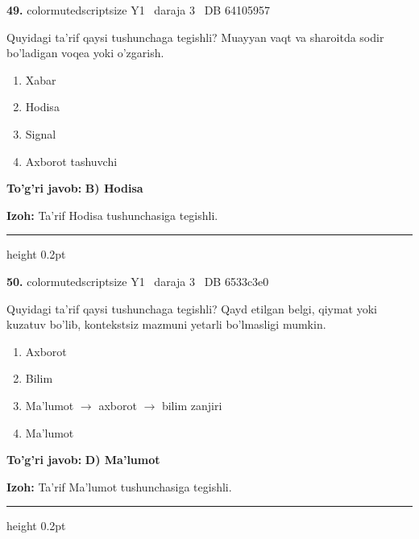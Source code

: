 \documentclass[10pt,a4paper,oneside]{article}
\begin{document}
\noindent\textbf{\color{ink}49.}  {color{muted}scriptsize Y1 \textbullet\ daraja 3 \textbullet\ DB 64105957}
\par
Quyidagi ta'rif qaysi tushunchaga tegishli? Muayyan vaqt va sharoitda sodir bo'ladigan voqea yoki o'zgarish.
\begin{enumerate}[label=\Alph*),leftmargin=9mm]
\item Xabar
\item Hodisa
\item Signal
\item Axborot tashuvchi
\end{enumerate}
\begin{tcolorbox}[enhanced,breakable,colback=teal!4,colframe=teal!50!black,boxrule=0.5pt,arc=1.1mm,left=3mm,right=3mm,top=1.7mm,bottom=1.7mm,before skip=2mm,after skip=2mm]
\textbf{\color{teal}To'g'ri javob:} \textbf{B) Hodisa}
\par\smallskip
\textbf{Izoh:} Ta'rif Hodisa tushunchasiga tegishli.
\end{tcolorbox}
\vspace{2mm}\hrule height 0.2pt \vspace{3mm}

\noindent\textbf{\color{ink}50.}  {color{muted}scriptsize Y1 \textbullet\ daraja 3 \textbullet\ DB 6533c3e0}
\par
Quyidagi ta'rif qaysi tushunchaga tegishli? Qayd etilgan belgi, qiymat yoki kuzatuv bo'lib, kontekstsiz mazmuni yetarli bo'lmasligi mumkin.
\begin{enumerate}[label=\Alph*),leftmargin=9mm]
\item Axborot
\item Bilim
\item Ma'lumot \ensuremath{\to} axborot \ensuremath{\to} bilim zanjiri
\item Ma'lumot
\end{enumerate}
\begin{tcolorbox}[enhanced,breakable,colback=teal!4,colframe=teal!50!black,boxrule=0.5pt,arc=1.1mm,left=3mm,right=3mm,top=1.7mm,bottom=1.7mm,before skip=2mm,after skip=2mm]
\textbf{\color{teal}To'g'ri javob:} \textbf{D) Ma'lumot}
\par\smallskip
\textbf{Izoh:} Ta'rif Ma'lumot tushunchasiga tegishli.
\end{tcolorbox}
\vspace{2mm}\hrule height 0.2pt \vspace{3mm}
\end{document}

